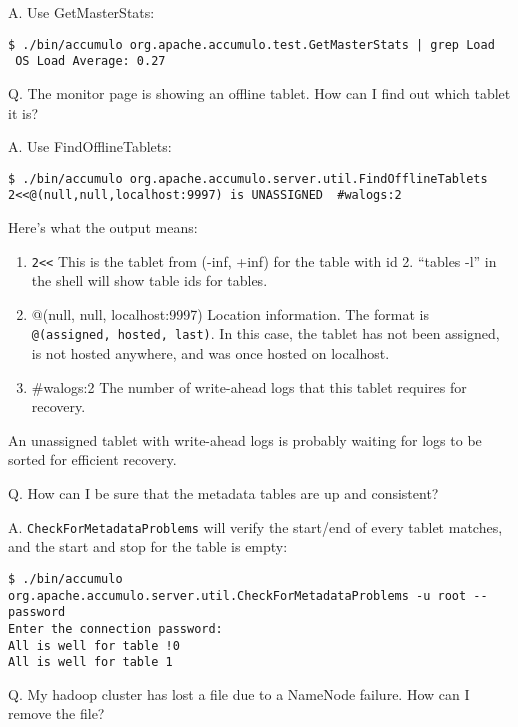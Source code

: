 A. Use GetMasterStats:

\begingroup\fontsize{8pt}{8pt}\selectfont\begin{verbatim}
$ ./bin/accumulo org.apache.accumulo.test.GetMasterStats | grep Load
 OS Load Average: 0.27
\end{verbatim}\endgroup

Q. The monitor page is showing an offline tablet.  How can I find out which tablet it is?

A. Use FindOfflineTablets:

\begingroup\fontsize{8pt}{8pt}\selectfont\begin{verbatim}
$ ./bin/accumulo org.apache.accumulo.server.util.FindOfflineTablets
2<<@(null,null,localhost:9997) is UNASSIGNED  #walogs:2
\end{verbatim}\endgroup

Here's what the output means:

\begin{enumerate}
\item{\texttt{2<<} This is the tablet from (-inf, +inf) for the
  table with id 2.  ``tables -l'' in the shell will show table ids for
  tables.}
\item{@(null, null, localhost:9997)} Location information.  The
  format is \texttt{@(assigned, hosted, last)}.  In this case, the
  tablet has not been assigned, is not hosted anywhere, and was once
  hosted on localhost.
\item{\#walogs:2} The number of write-ahead logs that this tablet requires for recovery.
\end{enumerate}

An unassigned tablet with write-ahead logs is probably waiting for
logs to be sorted for efficient recovery.

Q. How can I be sure that the metadata tables are up and consistent?

A. \texttt{CheckForMetadataProblems} will verify the start/end of
every tablet matches, and the start and stop for the table is empty:

\begingroup\fontsize{8pt}{8pt}\selectfont\begin{verbatim}
$ ./bin/accumulo org.apache.accumulo.server.util.CheckForMetadataProblems -u root --password
Enter the connection password: 
All is well for table !0
All is well for table 1
\end{verbatim}\endgroup

Q. My hadoop cluster has lost a file due to a NameNode failure.  How can I remove the file?

